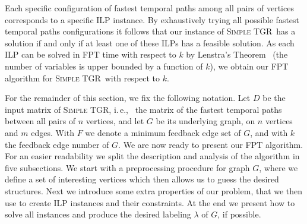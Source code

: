 \documentclass[a4paper,UKenglish,cleveref, autoref, thm-restate]{lipics-v2021}
\newcommand{\ie}{i.\,e.,\ }
\newcommand{\deltaExact}{\textsc{Simple TGR}}
\begin{document}
\begin{itemize}
    Each specific configuration of fastest temporal paths among all pairs of vertices corresponds to a specific ILP instance. By exhaustively trying all possible fastest temporal paths configurations it follows that our instance of \deltaExact\ has a solution if and only if at least one of these ILPs has a feasible solution.
    As each ILP can be solved in FPT time with respect to $k$ by Lenstra's Theorem~\cite{Lenstra1983Integer} (the number of variables is upper bounded by a function of $k$), we obtain our FPT algorithm for \deltaExact\ with respect to $k$.
\end{itemize}


For the remainder of this section, we fix the following notation. 
Let $D$ be the input matrix of \deltaExact, \ie
the matrix of the fastest temporal paths between all pairs of $n$ vertices, and let $G$ be its underlying graph, on $n$ vertices and $m$ edges.
With $F$ we denote a minimum feedback edge set of $G$, and with $k$ the feedback edge number of $G$.
We are now ready to present our FPT algorithm. For an easier readability we split the description and analysis of the algorithm in five subsections.
We start with a preprocessing procedure for graph $G$, where we define a set of interesting vertices which then allows us to guess the desired structures.
Next we introduce some extra properties of our problem, that we then use to create ILP instances and their constraints.
At the end we present how to solve all instances and produce the desired labeling $\lambda$ of $G$, if possible.
\end{document}
